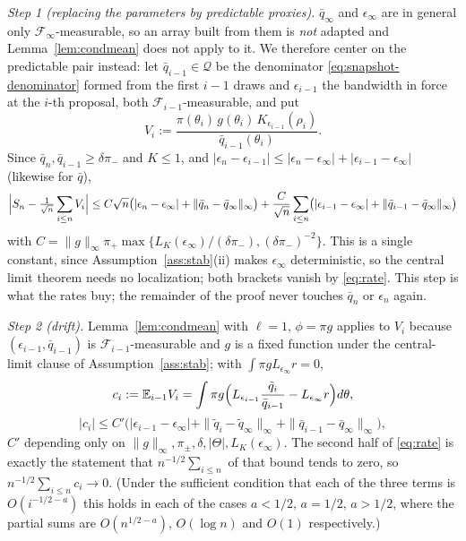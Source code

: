 \documentclass[pdflatex,sn-mathphys-num]{sn-jnl}
\theoremstyle{plain}
\theoremstyle{definition}
\begin{document}
\begin{appendices}
\emph{Step 1 (replacing the parameters by predictable proxies).} $\bar q_\infty$ and $\epsilon_\infty$ are in general only $\mathcal{F}_\infty$-measurable, so an array built from them is \emph{not} adapted and Lemma~\ref{lem:condmean} does not apply to it. We therefore center on the predictable pair instead: let $\bar q_{i-1}\in\mathcal{Q}$ be the denominator \eqref{eq:snapshot-denominator} formed from the first $i-1$ draws and $\epsilon_{i-1}$ the bandwidth in force at the $i$-th proposal, both $\mathcal{F}_{i-1}$-measurable, and put
\[
V_i:=\frac{\pi(\theta_i)\,g(\theta_i)\,K_{\epsilon_{i-1}}(\rho_i)}{\bar q_{i-1}(\theta_i)} .
\]
Since $\bar q_n,\bar q_{i-1}\ge\delta\pi_-$ and $K\le1$, and $|\epsilon_n-\epsilon_{i-1}|\le|\epsilon_n-\epsilon_\infty|+|\epsilon_{i-1}-\epsilon_\infty|$ (likewise for $\bar q$),
\[
\Bigl|S_n-\tfrac{1}{\sqrt n}\sum_{i\le n}V_i\Bigr|
\le C\sqrt n\bigl(|\epsilon_n-\epsilon_\infty|+\|\bar q_n-\bar q_\infty\|_\infty\bigr)
+\frac{C}{\sqrt n}\sum_{i\le n}\bigl(|\epsilon_{i-1}-\epsilon_\infty|+\|\bar q_{i-1}-\bar q_\infty\|_\infty\bigr)
\]
with $C=\|g\|_\infty\pi_+\max\{L_K(\epsilon_\infty)/(\delta\pi_-),(\delta\pi_-)^{-2}\}$. This is a single constant, since Assumption~\ref{ass:stab}(ii) makes $\epsilon_\infty$ deterministic, so the central limit theorem needs no localization; both brackets vanish by \eqref{eq:rate}. This step is what the rates buy; the remainder of the proof never touches $\bar q_n$ or $\epsilon_n$ again.

\emph{Step 2 (drift).} Lemma~\ref{lem:condmean} with $\ell=1$, $\phi=\pi g$ applies to $V_i$ because $(\epsilon_{i-1},\bar q_{i-1})$ is $\mathcal{F}_{i-1}$-measurable and $g$ is a fixed function under the central-limit clause of Assumption~\ref{ass:stab}; with $\int\pi gL_{\epsilon_\infty}r=0$,
\[
c_i:=\mathbb{E}_{i-1}V_i=\int\pi g\Bigl(L_{\epsilon_{i-1}}\frac{\tilde q_i}{\bar q_{i-1}}-L_{\epsilon_\infty}r\Bigr)d\theta,
\]
\[
|c_i|\le C'\bigl(|\epsilon_{i-1}-\epsilon_\infty|+\|\tilde q_i-\tilde q_\infty\|_\infty+\|\bar q_{i-1}-\bar q_\infty\|_\infty\bigr),
\]
$C'$ depending only on $\|g\|_\infty,\pi_\pm,\delta,|\Theta|,L_K(\epsilon_\infty)$. The second half of \eqref{eq:rate} is exactly the statement that $n^{-1/2}\sum_{i\le n}$ of that bound tends to zero, so $n^{-1/2}\sum_{i\le n}c_i\to0$. (Under the sufficient condition that each of the three terms is $O(i^{-1/2-a})$ this holds in each of the cases $a<1/2$, $a=1/2$, $a>1/2$, where the partial sums are $O(n^{1/2-a})$, $O(\log n)$ and $O(1)$ respectively.)


\end{appendices}
\end{document}
